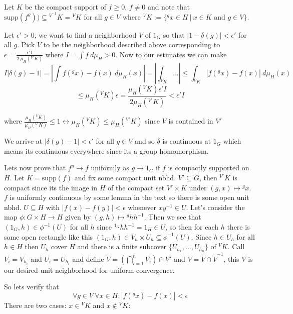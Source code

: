 \documentclass{article}
\begin{document}
Let $K$ be the compact support of $f \geq 0$, $f \neq 0$ and note that $\text{supp}(f^g)) \subseteq {}^{V^{-1}}K = {}^VK$ for all $g \in V$ where ${}^VK := \{{}^gx \in H \ | \ x \in K \text{ and } g \in V \}$. 

Let $\epsilon' > 0$, we want to find a neighborhood $V$ of $1_G$ so that $|1 - \delta(g)| < \epsilon'$ for all $g$. Pick $V$ to be the neighborhood described above corresponding to $\epsilon =\frac{\epsilon' I}{2 \ \mu_H({}^{V'}K)}$ where $I = \int f \ d \mu_H > 0$. Now to our estimates we can make
$$ I|\delta(g) - 1| = |\int f({}^gx) - f(x) \ d \mu_H(x) | = |\int_{{}^VK}  ...| \leq \int_{{}^VK} |f({}^gx) - f(x)| \ d \mu_H(x)$$ 
$$ \leq \mu_H({}^VK) \epsilon = \frac{\mu_H({}^VK) \epsilon' I}{2\mu_H({}^{V'}K)} < \epsilon' I$$ 

where $\frac{\mu_H({}^VK)}{\mu_H({}^{V'}K)} \leq 1 \longleftrightarrow  \mu_H({}^VK) \leq \mu_H({}^{V'}K)$ since $V$ is contained in $V'$

We arrive at $|\delta(g) - 1| < \epsilon'$ for all $g \in V$ and so $\delta$ is continuous at $1_G$ which means its continuous everywhere since its a group homomorphism.

\vspace{0.3cm}

Lets now prove that $f^g \rightarrow f$ uniformly as $g \rightarrow 1_G$ if $f$ is compactly supported on $H$. Let $K = \text{supp}(f)$ and fix some compact unit nbhd. $V' \subseteq G$, then ${}^{V'}K$ is compact since its the image in $H$ of the compact set $V' \times K$ under $(g,x) \mapsto {}^g x$. $f$ is uniformly continuous by some lemma in the text so there is some open unit nbhd. $U \subseteq H$ with $|f(x) - f(y)| < \epsilon$ whenever $xy^{-1} \in U$. Let's consider the map $\phi : G \times H \rightarrow H$ given by $(g,h) \mapsto {}^ghh^{-1}$. Then we see that $(1_G,h) \in \phi^{-1}(U)$ for all $h$ since ${}^{1_G}h h^{-1} = 1_H \in U$, so then for each $h$ there is some open rectangle like this $(1_G, h) \in V_h \times U_h \subseteq \phi^{-1}(U)$. Since $h \in U_h$ for all $h \in H$ then  $U_h$ cover $H$ and there is a finite subcover $\{U_{h_1}, ..., U_{h_n} \}$ of ${}^VK$. Call $V_i = V_{h_i}$ and $U_i = U_{h_i}$ and define $\tilde V = (\bigcap\limits_{i = 1}^n V_i) \cap V'$ and $V = \tilde V \cap \tilde V^{-1}$, this $V$ is our desired unit neighborhood for uniform convergence. 

So lets verify that $$\forall g \in V \ \forall x \in H:|f(^gx) - f(x)| < \epsilon$$ There are two cases: $x \in {}^VK$ and $x \not \in {}^VK$:
\end{document}
